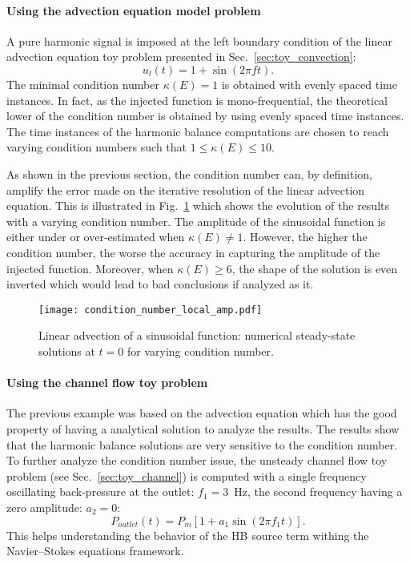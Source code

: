 \paragraph{Using the advection equation model problem}

A pure harmonic signal is imposed at the left boundary condition
of the linear advection equation toy problem presented in Sec.~\ref{sec:toy_convection}:
\begin{equation}
   u_l (t) = 1 + \sin \left(2 \pi f t\right).
\end{equation}
The minimal condition number
$\kappa(E) = 1$ is obtained with evenly spaced time instances.
In fact, as the injected function is mono-frequential, 
the theoretical lower of the condition number is obtained by using evenly
spaced time instances.
The time instances of the harmonic balance
computations are chosen to reach varying condition numbers
such that $1 \leq \kappa (E) \leq 10$.  

As shown in the previous section, the condition number 
can, by definition, amplify the error made
on the iterative resolution of the linear advection equation.
This is illustrated in Fig.~\ref{fig:condition_number_local_amp} which 
shows the evolution of the results with a varying condition number.
The amplitude of the
sinusoidal function is either under or over-estimated when
$\kappa (E) \neq 1$. However, 
the higher the condition number, the worse the accuracy in capturing
the amplitude of the injected function. Moreover, when $\kappa(E) \geq 6$,
the shape of the solution is even inverted which would lead to
bad conclusions if analyzed as it.
\begin{figure}[htbp]
  \centering
  \texttt{[image: condition\_number\_local\_amp.pdf]}
  \caption{Linear advection of a sinusoidal function: numerical steady-state 
  solutions at $t=0$ for varying condition number.}
  \label{fig:condition_number_local_amp}
\end{figure}

\paragraph{Using the channel flow toy problem}
The previous example was based on the advection equation which
has the good property of having a analytical solution to 
analyze the results. The results show that the harmonic
balance solutions are very sensitive to the condition number.
To further analyze the condition number issue,
the unsteady channel flow toy problem
(see Sec.~\ref{sec:toy_channel}) is computed with a single
frequency oscillating back-pressure 
at the outlet: $f_1 = 3$~Hz, the second
frequency having a zero amplitude: $a_2= 0$:
\begin{equation}
   P_{outlet} (t) = P_m \left[ 1 + a_1 \sin \left(2 \pi f_1 t\right) \right].
\end{equation}
This helps understanding the behavior of the HB source term
withing the Navier--Stokes equations framework.

